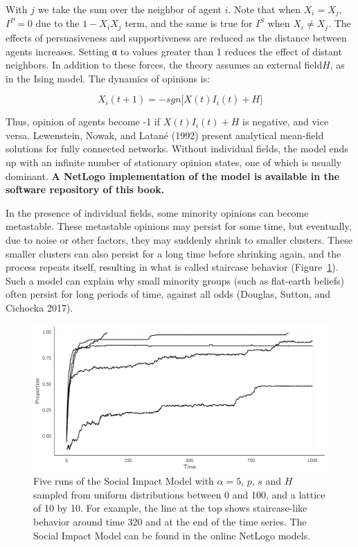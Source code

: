 \documentclass[
  a4paper,
  DIV=11,
  numbers=noendperiod,
  oneside]{scrreprt}
\begin{document}
With \(j\) we take the sum over the neighbor of agent \(i\). Note that
when \(X_{i} = X_{j}\), \(I^{P} = 0\) due to the \(1 - X_{i}X_{j}\)
term, and the same is true for \(I^{S}\) when \(X_{i} \neq X_{j}\). The
effects of persuasiveness and supportiveness are reduced as the distance
between agents increases. Setting α to values greater than 1 reduces the
effect of distant neighbors. In addition to these forces, the theory
assumes an external field\(H\), as in the Ising model. The dynamics of
opinions is:

\[X_{i}(t + 1) = - sgn\lbrack X(t)I_{i}(t) + H\rbrack\]

Thus, opinion of agents become -1 if \(X(t)I_{i}(t) + H\) is negative,
and vice versa. Lewenstein, Nowak, and Latané (1992) present analytical
mean-field solutions for fully connected networks. Without individual
fields, the model ends up with an infinite number of stationary opinion
states, one of which is usually dominant. \textbf{A NetLogo
implementation of the model is available in the software repository of
this book.}

In the presence of individual fields, some minority opinions can become
metastable. These metastable opinions may persist for some time, but
eventually, due to noise or other factors, they may suddenly shrink to
smaller clusters. These smaller clusters can also persist for a long
time before shrinking again, and the process repeats itself, resulting
in what is called staircase behavior (Figure~\ref{fig-ch7-img6-old-94}).
Such a model can explain why small minority groups (such as flat-earth
beliefs) often persist for long periods of time, against all odds
(Douglas, Sutton, and Cichocka 2017).

\begin{figure}

{\centering \includegraphics{media/ch7/fig-ch7-img6-old-94.jpg}

}

\caption{\label{fig-ch7-img6-old-94}Five runs of the Social Impact Model
with \(\alpha = 5\), \(p\), \(s\) and \(H\) sampled from uniform
distributions between 0 and 100, and a lattice of 10 by 10. For example,
the line at the top shows staircase-like behavior around time 320 and at
the end of the time series. The Social Impact Model can be found in the
online NetLogo models.}

\end{figure}
\end{document}

